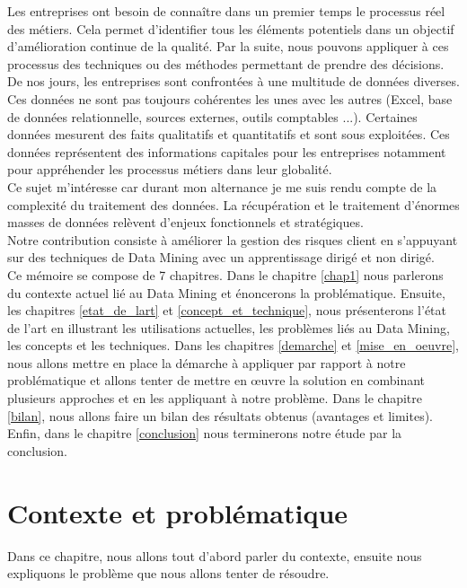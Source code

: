 \documentclass[11pt,a4paper]{report}
\begin{document}
Les entreprises ont besoin de connaître dans un premier temps le processus réel des métiers. Cela permet d'identifier tous les éléments potentiels dans un objectif d'amélioration continue de la qualité. Par la suite, nous pouvons appliquer à ces processus des techniques ou des méthodes permettant de prendre des décisions.
De nos jours, les entreprises sont confrontées à une multitude de données diverses. Ces données ne sont pas toujours cohérentes les unes avec les autres (Excel, base de données relationnelle, sources externes, outils comptables ...). Certaines données mesurent des faits qualitatifs et quantitatifs et sont sous exploitées. Ces données représentent des informations capitales pour les entreprises notamment pour appréhender les processus métiers dans leur globalité.\\
Ce sujet m'intéresse car durant mon alternance je me suis rendu compte de la complexité du traitement des données. La récupération et le traitement d'énormes masses de données relèvent d'enjeux fonctionnels et stratégiques. \\
Notre contribution consiste à améliorer la gestion des risques client en s'appuyant sur des techniques de Data Mining avec un apprentissage dirigé et non dirigé.\\ 

Ce mémoire se compose de 7 chapitres. Dans le chapitre \ref{chap1} nous parlerons du contexte actuel lié au Data Mining et énoncerons la problématique. Ensuite, les chapitres  \ref{etat_de_lart}  et \ref{concept_et_technique}, nous présenterons l'état de l'art en illustrant les utilisations actuelles, les problèmes liés au Data Mining, les concepts et les techniques. Dans les chapitres \ref{demarche} et \ref{mise_en_oeuvre}, nous allons mettre en place la démarche à appliquer par rapport à notre problématique et allons tenter de mettre en œuvre la solution en combinant plusieurs approches et en les appliquant à notre problème. Dans le chapitre \ref{bilan}, nous allons faire un bilan des résultats obtenus (avantages et limites). Enfin, dans le chapitre \ref{conclusion} nous terminerons notre étude par la conclusion. 

\newpage

\tableofcontents
\thispagestyle{empty}
\newpage
\listoffigures
\newpage
\listoftables
\newpage
\section{Contexte et problématique \label{chap1}}
Dans ce chapitre, nous allons tout d'abord parler du contexte, ensuite nous expliquons le problème que nous allons tenter de résoudre. 
\end{document}
